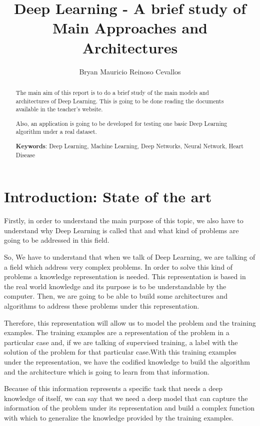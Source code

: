 \documentclass[12pt]{article}
\title{Deep Learning - A brief study of Main Approaches and Architectures}
\author{Bryan Mauricio Reinoso Cevallos}
\begin{document}
 

\maketitle
\begin{abstract} 
The main aim of this report is to do a brief study of the main models and architectures of Deep Learning. This is going to be done reading the documents available in the teacher's website. 

Also, an application is going to be developed for testing one basic Deep Learning algorithm under a real dataset\cite{heartDiseaseB,heartDiseaseC,heartDiseaseH,heartDiseaseZ}.
  
  \textbf{Keywords}: Deep Learning, Machine Learning, Deep Networks, Neural Network, Heart Disease
\end{abstract}

\section{Introduction: State of the art}

Firstly, in order to understand the main purpose of this topic, we also have to understand why Deep Learning is called that and what kind of problems are going to be addressed in this field.

So, We have to understand that when we talk of Deep Learning, we are talking of a field which address very complex problems. In order to solve this kind of problems a knowledge representation is needed. This representation is based in the real world knowledge and its purpose is to be understandable by the computer. Then, we are going to be able to build some architectures and algorithms to address these problems under this representation.

Therefore, this representation will allow us to model the problem and the training examples. The training examples are a representation of the problem in a particular case and, if we are talking of supervised training, a label with the solution of the problem for that particular case.With this training examples under the representation, we have the codified knowledge to build the algorithm and the architecture which is going to learn from that information.

Because of this information represents a specific task that needs a deep knowledge of itself, we can say that we need a deep model that can capture the information of the problem under its representation and build a complex function with which to generalize the knowledge provided by the training examples.
\end{document}
